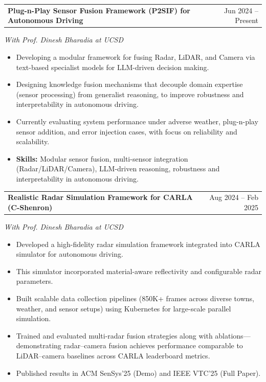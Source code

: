 \documentclass[10pt, letterpaper]{article}
\makeatletter
\newenvironment{highlights}{
    \begin{itemize}[
        topsep=0.10 cm,
        parsep=0.10 cm,
        partopsep=0pt,
        itemsep=0pt,
        leftmargin=0.4 cm + 10pt
    ]
}{
    \end{itemize}
} %
\newenvironment{projectentry}[3]{%
  \onecolentry
  \begin{tabular*}{\textwidth}{@{\extracolsep{\fill}} l r}
    \textbf{#1} & #2 \\
  \end{tabular*}
  \textit{#3} \par
  \vspace{0.2em} %
}{%
  \endonecolentry
}
\makeatother
\begin{document}
\vspace{0.4 cm}

\begin{projectentry}{Plug-n-Play Sensor Fusion Framework (P2SIF) for Autonomous Driving}{Jun 2024 -- Present}{With Prof. Dinesh Bharadia at UCSD}
    \begin{highlights}
        \item Developing a modular framework for fusing Radar, LiDAR, and Camera via text-based specialist models for LLM-driven decision making.
        \item Designing knowledge fusion mechanisms that decouple domain expertise (sensor processing) from generalist reasoning, to improve robustness and interpretability in autonomous driving.
        \item Currently evaluating system performance under adverse weather, plug-n-play sensor addition, and error injection cases, with focus on reliability and scalability.
        \item \textbf{Skills:} Modular sensor fusion, multi-sensor integration (Radar/LiDAR/Camera), LLM-driven reasoning, robustness and interpretability in autonomous driving.
    \end{highlights}
\end{projectentry}

\vspace{0.4 cm}

\begin{projectentry}{Realistic Radar Simulation Framework for CARLA (C-Shenron)}{Aug 2024 -- Feb 2025}{With Prof. Dinesh Bharadia at UCSD}
    \begin{highlights}
        \item Developed a high-fidelity radar simulation framework integrated into CARLA simulator for autonomous driving.
        \item This simulator incorporated material-aware reflectivity and configurable radar parameters.
        \item Built scalable data collection pipelines (850K+ frames across diverse towns, weather, and sensor setups) using Kubernetes for large-scale parallel simulation. 
        \item Trained and evaluated multi-radar fusion strategies along with ablations—demonstrating radar–camera fusion achieves performance comparable to LiDAR–camera baselines across CARLA leaderboard metrics.
        \item Published results in ACM SenSys’25 (Demo) and IEEE VTC’25 (Full Paper).
    \end{highlights}
\end{projectentry}
\end{document}

